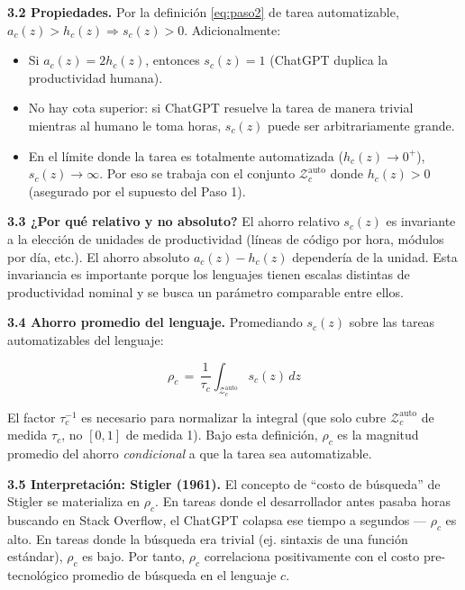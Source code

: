 \documentclass[11pt,a4paper]{article}
\theoremstyle{definition}
\begin{document}
\textbf{3.2 Propiedades.} Por la definición \eqref{eq:paso2} de tarea automatizable, $a_c(z) > h_c(z) \Rightarrow s_c(z) > 0$. Adicionalmente:
\begin{itemize}[leftmargin=*]
  \item Si $a_c(z) = 2h_c(z)$, entonces $s_c(z) = 1$ (ChatGPT duplica la productividad humana).
  \item No hay cota superior: si ChatGPT resuelve la tarea de manera trivial mientras al humano le toma horas, $s_c(z)$ puede ser arbitrariamente grande.
  \item En el límite donde la tarea es totalmente automatizada ($h_c(z) \to 0^+$), $s_c(z) \to \infty$. Por eso se trabaja con el conjunto $\mathcal{Z}_c^{\text{auto}}$ donde $h_c(z) > 0$ (asegurado por el supuesto del Paso 1).
\end{itemize}

\textbf{3.3 ¿Por qué relativo y no absoluto?} El ahorro relativo $s_c(z)$ es invariante a la elección de unidades de productividad (líneas de código por hora, módulos por día, etc.). El ahorro absoluto $a_c(z) - h_c(z)$ dependería de la unidad. Esta invariancia es importante porque los lenguajes tienen escalas distintas de productividad nominal y se busca un parámetro comparable entre ellos.

\textbf{3.4 Ahorro promedio del lenguaje.} Promediando $s_c(z)$ sobre las tareas automatizables del lenguaje:

\begin{equation}
\rho_c \,=\, \frac{1}{\tau_c}\int_{\mathcal{Z}_c^{\text{auto}}} s_c(z)\, dz
\label{eq:rhoc}
\end{equation}

El factor $\tau_c^{-1}$ es necesario para normalizar la integral (que solo cubre $\mathcal{Z}_c^{\text{auto}}$ de medida $\tau_c$, no $[0,1]$ de medida 1). Bajo esta definición, $\rho_c$ es la magnitud promedio del ahorro \textit{condicional} a que la tarea sea automatizable.

\textbf{3.5 Interpretación: Stigler (1961).} El concepto de ``costo de búsqueda'' de Stigler se materializa en $\rho_c$. En tareas donde el desarrollador antes pasaba horas buscando en Stack Overflow, el ChatGPT colapsa ese tiempo a segundos --- $\rho_c$ es alto. En tareas donde la búsqueda era trivial (ej. sintaxis de una función estándar), $\rho_c$ es bajo. Por tanto, $\rho_c$ correlaciona positivamente con el costo pre-tecnológico promedio de búsqueda en el lenguaje $c$.

\end{document}
